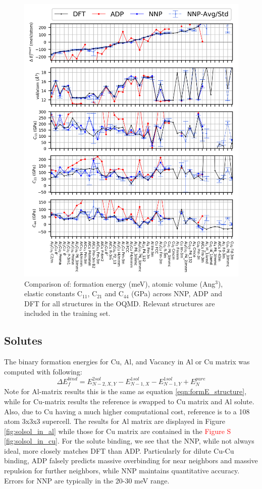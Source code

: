 \documentclass{article}
\begin{document}
\begin{figure}[H]%
\centering%
\includegraphics[width=1\textwidth,center]{figures/matparam_stats1.png}%
\caption{Comparison of: formation energy (meV), atomic volume (Ang$^3$), elastic constants C$_{11}$, C$_{21}$ and C$_{44}$ (GPa) across NNP, ADP and DFT for all structures in the OQMD. 
Relevant structures are included in the training set. }
\label{fig:matparam_stats1}
\end{figure}

\subsection{Solutes}
The binary formation energies for Cu, Al, and Vacancy in Al or Cu matrix was computed with following:
\begin{equation}
\Delta E^{bind}_f = E^{2sol}_{N-2,X,Y}-E^{1sol}_{N-1,X}-E^{1sol}_{N-1,Y}+E^{pure}_N
\end{equation}
Note for Al-matrix results this is the same as equation \ref{eqn:formE_structure}, while for 
Cu-matrix results the reference is swapped to Cu matrix and Al solute.
Also, due to Cu having a much higher computational cost, reference is to a 108 atom 3x3x3 supercell.
The results for Al matrix are displayed in Figure \ref{fig:solsol_in_al} while those for Cu matrix are contained in the \textcolor{red}{Figure S \ref{fig:solsol_in_cu}}.
For the solute binding, we see that the NNP, while not always ideal, more closely matches DFT than ADP.
Particularly for dilute Cu-Cu binding, ADP falsely predicts massive overbinding for near neighbors and massive repulsion for further neighbors, while NNP maintains quantitative accuracy.
Errors for NNP are typically in the 20-30 meV range.
\end{document}
